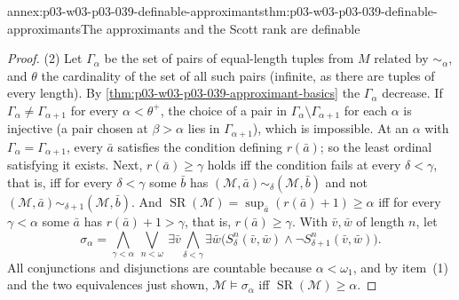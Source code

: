 \begin{annexitem}{annex:p03-w03-p03-039-definable-approximants}{thm:p03-w03-p03-039-definable-approximants}{The approximants and the Scott rank are definable}
\begin{proof}
(2) Let \(\Gamma_\alpha\) be the set of pairs of equal-length tuples from
\(M\) related by \(\sim_\alpha\), and \(\theta\) the cardinality of the set of
all such pairs (infinite, as there are tuples of every length). By
\cref{thm:p03-w03-p03-039-approximant-basics} the \(\Gamma_\alpha\) decrease.
If \(\Gamma_\alpha\ne\Gamma_{\alpha+1}\) for every \(\alpha<\theta^+\), the
choice of a pair in \(\Gamma_\alpha\setminus\Gamma_{\alpha+1}\) for each
\(\alpha\) is injective (a pair chosen at \(\beta>\alpha\) lies in
\(\Gamma_{\alpha+1}\)), which is impossible. At an \(\alpha\) with
\(\Gamma_\alpha=\Gamma_{\alpha+1}\), every \(\bar a\) satisfies the condition
defining \(r(\bar a)\); so the least ordinal satisfying it exists. Next,
\(r(\bar a)\ge\gamma\) holds iff the condition fails at every \(\delta<\gamma\),
that is, iff for every \(\delta<\gamma\) some \(\bar b\) has
\((\mathcal M,\bar a)\sim_\delta(\mathcal M,\bar b)\) and not
\((\mathcal M,\bar a)\sim_{\delta+1}(\mathcal M,\bar b)\). And
\(\operatorname{SR}(\mathcal M)=\sup_{\bar a}(r(\bar a)+1)\ge\alpha\) iff for
every \(\gamma<\alpha\) some \(\bar a\) has \(r(\bar a)+1>\gamma\), that is,
\(r(\bar a)\ge\gamma\). With \(\bar v,\bar w\) of length \(n\), let
\[
\sigma_\alpha=\bigwedge_{\gamma<\alpha}\ \bigvee_{n<\omega}\ \exists\bar v\bigwedge_{\delta<\gamma}\exists\bar w\bigl(S^n_\delta(\bar v,\bar w)\wedge\neg S^n_{\delta+1}(\bar v,\bar w)\bigr).
\]
All conjunctions and disjunctions are countable because \(\alpha<\omega_1\),
and by item~(1) and the two equivalences just shown,
\(\mathcal M\models\sigma_\alpha\) iff \(\operatorname{SR}(\mathcal M)\ge\alpha\).
\end{proof}
\end{annexitem}

